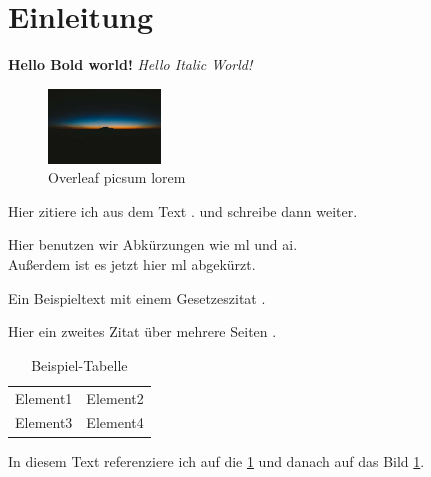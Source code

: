 \documentclass[../main.tex]{subfiles}
\begin{document}
\section{Einleitung}

\textbf{Hello Bold world!} %
\textit{Hello Italic World!} %

\begin{figure}[h]
    \centering
    \includegraphics[width=3cm]{images/picsum lorem.jpg} %
    \caption{Overleaf picsum lorem} %
    \label{fig:picsum_lorem} %
\end{figure}

Hier zitiere ich aus dem Text \autocite[10]{smith2018}. und schreibe dann weiter.\par %

Hier benutzen wir Abkürzungen wie \gls{ml} und \gls{ai}.\\ %
Außerdem ist es jetzt hier \gls{ml} abgekürzt.\par %


Ein Beispieltext mit einem Gesetzeszitat . %

Hier ein zweites Zitat über mehrere Seiten \autocite[15-27]{johnson2020}. %

\medskip

\begin{table}[h]
    \centering
    \begin{tabular}{cc}
        Element1 & Element2\\
        Element3 & Element4\\
    \end{tabular}
    \caption{Beispiel-Tabelle} %
    \label{tab:example_table} %
\end{table}

In diesem Text referenziere ich auf die  \cref{tab:example_table} und danach auf das Bild \cref{fig:picsum_lorem}.
\end{document}

